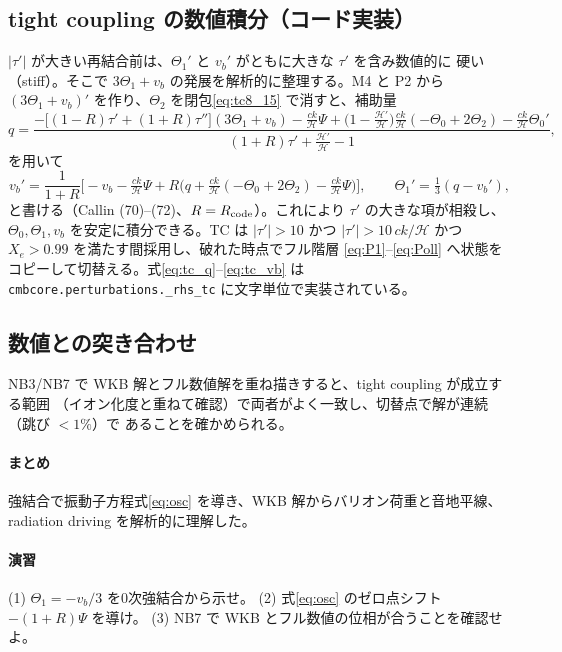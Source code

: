 \subsection{tight coupling の数値積分（コード実装）}
$|\tau'|$ が大きい再結合前は、$\Theta_1'$ と $v_b'$ がともに大きな $\tau'$ を含み数値的に
硬い（stiff）。そこで $3\Theta_1+v_b$ の発展を解析的に整理する。M4 と P2 から
$(3\Theta_1+v_b)'$ を作り、$\Theta_2$ を閉包\eqref{eq:tc8_15} で消すと、補助量
\begin{equation}
  q=\frac{-\big[(1-R)\tau'+(1+R)\tau''\big](3\Theta_1+v_b)
    -\tfrac{ck}{\mathcal H}\Psi
    +\big(1-\tfrac{\mathcal H'}{\mathcal H}\big)\tfrac{ck}{\mathcal H}(-\Theta_0+2\Theta_2)
    -\tfrac{ck}{\mathcal H}\Theta_0'}
    {(1+R)\tau'+\tfrac{\mathcal H'}{\mathcal H}-1},
  \label{eq:tc_q}
\end{equation}
を用いて
\begin{equation}
  v_b'=\frac{1}{1+R}\Big[-v_b-\tfrac{ck}{\mathcal H}\Psi
    +R\big(q+\tfrac{ck}{\mathcal H}(-\Theta_0+2\Theta_2)-\tfrac{ck}{\mathcal H}\Psi\big)\Big],
  \qquad \Theta_1'=\tfrac13(q-v_b'),
  \label{eq:tc_vb}
\end{equation}
と書ける（Callin (70)--(72)、$R=R_{\rm code}$）。これにより $\tau'$ の大きな項が相殺し、
$\Theta_0,\Theta_1,v_b$ を安定に積分できる。TC は $|\tau'|>10$ かつ
$|\tau'|>10\,ck/\mathcal H$ かつ $X_e>0.99$ を満たす間採用し、破れた時点でフル階層
\eqref{eq:P1}--\eqref{eq:Poll} へ状態をコピーして切替える。式\eqref{eq:tc_q}--\eqref{eq:tc_vb} は
\texttt{cmbcore.perturbations.\_rhs\_tc} に文字単位で実装されている。

\subsection{数値との突き合わせ}
NB3/NB7 で WKB 解とフル数値解を重ね描きすると、tight coupling が成立する範囲
（イオン化度と重ねて確認）で両者がよく一致し、切替点で解が連続（跳び $<1\%$）で
あることを確かめられる。

\paragraph{まとめ}
強結合で振動子方程式\eqref{eq:osc} を導き、WKB 解からバリオン荷重と音地平線、
radiation driving を解析的に理解した。

\paragraph{演習}
(1) $\Theta_1=-v_b/3$ を0次強結合から示せ。
(2) 式\eqref{eq:osc} のゼロ点シフト $-(1+R)\Psi$ を導け。
(3) NB7 で WKB とフル数値の位相が合うことを確認せよ。
